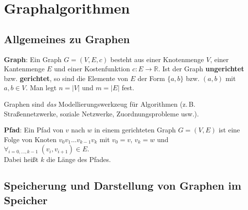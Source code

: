 \chapter{%
    Graphalgorithmen%
}

\section{%
    Allgemeines zu Graphen%
}

\textbf{Graph}:
Ein Graph $G = (V, E, c)$ besteht aus einer Knotenmenge $V$,
einer Kantenmenge $E$ und einer Kostenfunktion $c: E \rightarrow \mathbb{R}$.
Ist der Graph \textbf{ungerichtet} bzw. \textbf{gerichtet},
so sind die Elemente von $E$ der Form $\{a, b\}$ bzw. $(a, b)$ mit
$a, b \in V$.
Man legt $n = |V|$ und $m = |E|$ fest.

Graphen sind \emph{das} Modellierungswerkzeug für Algorithmen
(z.\,B. Straßennetzwerke, soziale Netzwerke, Zuordnungsprobleme usw.).

\textbf{Pfad}:
Ein Pfad von $v$ nach $w$ in einem gerichteten Graph $G = (V, E)$
ist eine Folge von Knoten $v_0 v_1 \dotsc v_{k-1} v_k$ mit
$v_0 = v$, $v_k = w$ und $\forall_{i=0,\dotsc,k-1}\; (v_i, v_{i+1}) \in E$. \\
Dabei heißt $k$ die Länge des Pfades.

\section{%
    Speicherung und Darstellung von Graphen im Speicher%
}

